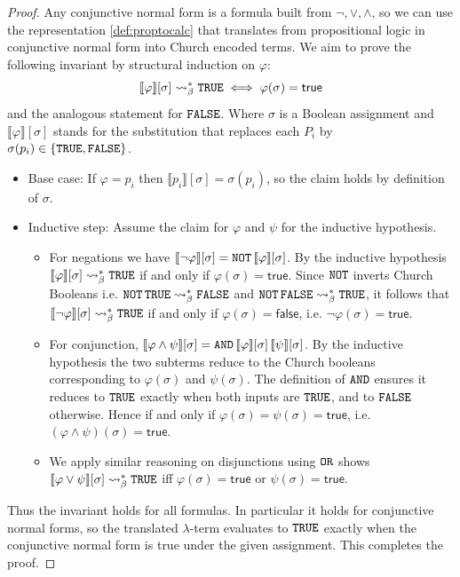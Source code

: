 \begin{proof} Any conjunctive normal form is a formula built from $\neg,\vee,\wedge$, so we can use the representation \ref{def:proptocalc} that translates from propositional logic in conjunctive normal form into Church encoded terms. We aim to prove the following invariant by structural induction on $\varphi$:
  \[
    \llbracket\varphi\rrbracket[\sigma]\mathrel{\leadsto}_\beta^*\texttt{TRUE}
    \iff \varphi(\sigma)=\mathsf{true}
  \]
  and the analogous statement for $\texttt{FALSE}$. Where $\sigma$ is a Boolean assignment and $\llbracket\varphi\rrbracket[\sigma]$ stands for the substitution that replaces each $P_i$ by $\sigma(p_i)\in\{\texttt{TRUE},\texttt{FALSE}\}$.

  \begin{itemize}

  \item Base case: If $\varphi=p_i$ then $\llbracket p_i\rrbracket[\sigma]=\sigma(p_i)$,
    so the claim holds by definition of $\sigma$.

  \item Inductive step: Assume the claim for $\varphi$ and $\psi$ for the inductive hypothesis.
    \begin{itemize}
    \item For negations we have $\llbracket\neg\varphi\rrbracket[\sigma]=\texttt{NOT}\,\llbracket\varphi\rrbracket[\sigma]$.
      By the inductive hypothesis $\llbracket\varphi\rrbracket[\sigma]\mathrel{\leadsto}_\beta^*\texttt{TRUE}$
      if and only if $\varphi(\sigma)=\mathsf{true}$. Since $\texttt{NOT}$ inverts Church Booleans
      i.e. $\texttt{NOT}\,\texttt{TRUE}\mathrel{\leadsto}_\beta^*\texttt{FALSE}$ and
      $\texttt{NOT}\,\texttt{FALSE}\mathrel{\leadsto}_\beta^*\texttt{TRUE}$, it follows that
      $\llbracket\neg\varphi\rrbracket[\sigma]\mathrel{\leadsto}_\beta^*\texttt{TRUE}$ if and only if
      $\varphi(\sigma)=\mathsf{false}$, i.e. $\neg\varphi(\sigma)=\mathsf{true}$.
    \item For conjunction, $\llbracket\varphi\wedge\psi\rrbracket[\sigma]
      =\texttt{AND}\,\llbracket\varphi\rrbracket[\sigma]\,\llbracket\psi\rrbracket[\sigma]$.
      By the inductive hypothesis the two subterms reduce to the Church booleans corresponding to
      $\varphi(\sigma)$ and $\psi(\sigma)$. The definition of $\texttt{AND}$
      ensures it reduces to $\texttt{TRUE}$ exactly when both inputs are
      $\texttt{TRUE}$, and to $\texttt{FALSE}$ otherwise. Hence if and only if $\varphi(\sigma)=\psi(\sigma)=\mathsf{true}$,
      i.e. $(\varphi\wedge\psi)(\sigma)=\mathsf{true}$.
    \item We apply similar reasoning on disjunctions using $\texttt{OR}$ shows
      $\llbracket\varphi\vee\psi\rrbracket[\sigma]\mathrel{\leadsto}_\beta^*\texttt{TRUE}$
      iff $\varphi(\sigma)=\mathsf{true}$ or $\psi(\sigma)=\mathsf{true}$.
    \end{itemize}
  \end{itemize}
  Thus the invariant holds for all formulas. In particular it holds for conjunctive normal forms,
  so the translated $\lambda$-term evaluates to $\texttt{TRUE}$ exactly when
  the conjunctive normal form is true under the given assignment. This completes the proof.
\end{proof}


